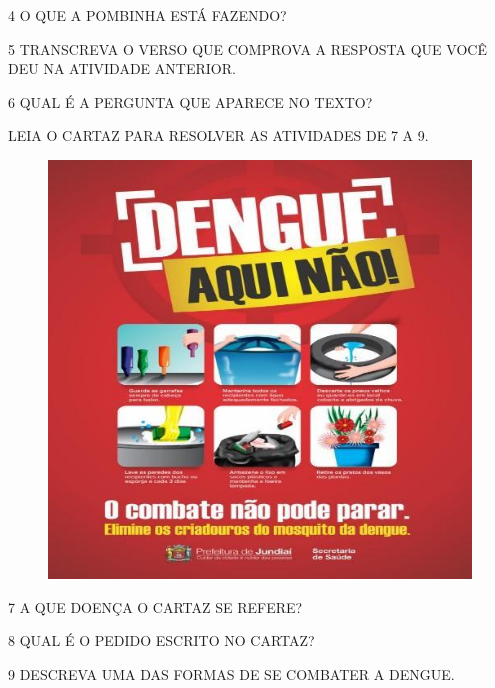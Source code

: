 \num{4} O QUE A POMBINHA ESTÁ FAZENDO?\enlargethispage{2\baselineskip}


\num{5} TRANSCREVA O VERSO QUE COMPROVA A RESPOSTA QUE VOCÊ DEU NA ATIVIDADE ANTERIOR.


\num{6} QUAL É A PERGUNTA QUE APARECE NO TEXTO?


LEIA O CARTAZ PARA RESOLVER AS ATIVIDADES DE 7 A 9.

\begin{figure}[H]
\centering
\includegraphics[width=\textwidth]{media/image127.jpg}
\end{figure}

\num{7} A QUE DOENÇA O CARTAZ SE REFERE?\enlargethispage{\baselineskip}


\num{8} QUAL É O PEDIDO ESCRITO NO CARTAZ?


\num{9} DESCREVA UMA DAS FORMAS DE SE COMBATER A DENGUE.

